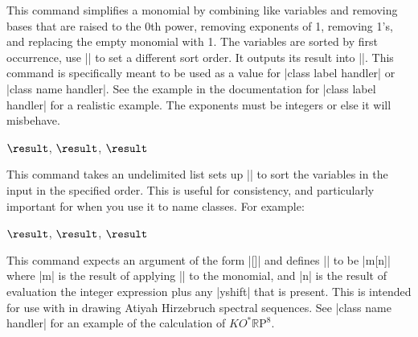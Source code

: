 \begin{sseqdata}[name = basic, cohomological Serre grading]
\begin{command}{\SseqNormalizeMonomial}
This command simplifies a monomial by combining like variables and removing
bases that are raised to the 0th power, removing exponents of 1, removing 1's,
and replacing the empty monomial with 1. The variables are sorted by first
occurrence, use |\SseqNormalizeMonomialSetVariables| to set a different sort
order. It outputs its result into |\result|. This command is specifically meant
to be used as a value for |class label handler| or |class name handler|. See the
example in the documentation for |class label handler| for a realistic example.
The exponents must be integers or else it will misbehave.
\begin{codeexample}[]
 $\result$, \quad
{} $\result$, \quad
{} $\result$
\end{codeexample}
\end{command}

\begin{command}{\SseqNormalizeMonomialSetVariables}
This command takes an undelimited list sets up |\SseqNormalizeMonomial| to sort
the variables in the input in the specified order. This is useful for
consistency, and particularly important for when you use it to name classes.
For example:
\begin{codeexample}[]
 $\result$, \quad
{} $\result$, \quad
{} $\result$
\end{codeexample}
\SseqNormalizeMonomialSetVariables{}
\end{command}


\begin{command}{\SseqAHSSNameHandler}
This command expects an argument of the form%
|[]| and defines |\result| to be |m[n]|
where |m| is the result of applying |\SseqNormalizeMonomial| to the monomial,
and |n| is the result of evaluation the integer expression plus any |yshift|
that is present. This is intended for use with in drawing Atiyah Hirzebruch
spectral sequences. See |class name handler| for an example of the calculation
of $KO^*\mathbb{R}\mathrm{P}^8$.
\end{command}


\end{sseqdata}
